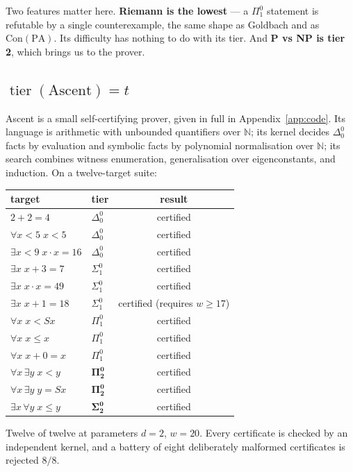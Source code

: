 \documentclass[11pt,a4paper]{article}
\newcommand{\Sig}[2]{\Sigma^{#1}_{#2}}
\newcommand{\Pai}[2]{\Pi^{#1}_{#2}}
\newcommand{\Del}[2]{\Delta^{#1}_{#2}}
\newcommand{\tier}{\operatorname{tier}}
\begin{document}
Two features matter here. \textbf{Riemann is the lowest} --- a $\Pai{0}{1}$
statement is refutable by a single counterexample, the same shape as Goldbach
and as $\mathrm{Con}(\mathrm{PA})$. Its difficulty has nothing to do with its
tier. And \textbf{P vs NP is tier 2}, which brings us to the prover.

\subsection{$\tier(\text{Ascent}) = t$}

Ascent is a small self-certifying prover, given in full in
Appendix~\ref{app:code}. Its language is arithmetic with unbounded quantifiers
over $\mathbb{N}$; its kernel decides $\Del{0}{0}$ facts by evaluation and
symbolic facts by polynomial normalisation over $\mathbb{N}$; its search
combines witness enumeration, generalisation over eigenconstants, and
induction. On a twelve-target suite:

\begin{center}
\begin{tabular}{@{}llc@{}}
\toprule
target & tier & result \\
\midrule
$2+2 = 4$ & $\Del{0}{0}$ & certified \\
$\forall x{<}5\; x < 5$ & $\Del{0}{0}$ & certified \\
$\exists x{<}9\; x\cdot x = 16$ & $\Del{0}{0}$ & certified \\
$\exists x\; x+3 = 7$ & $\Sig{0}{1}$ & certified \\
$\exists x\; x\cdot x = 49$ & $\Sig{0}{1}$ & certified \\
$\exists x\; x+1 = 18$ & $\Sig{0}{1}$ & certified (requires $w \ge 17$) \\
$\forall x\; x < Sx$ & $\Pai{0}{1}$ & certified \\
$\forall x\; x \le x$ & $\Pai{0}{1}$ & certified \\
$\forall x\; x+0 = x$ & $\Pai{0}{1}$ & certified \\
$\forall x\, \exists y\; x < y$ & $\mathbf{\Pai{0}{2}}$ & certified \\
$\forall x\, \exists y\; y = Sx$ & $\mathbf{\Pai{0}{2}}$ & certified \\
$\exists x\, \forall y\; x \le y$ & $\mathbf{\Sig{0}{2}}$ & certified \\
\bottomrule
\end{tabular}
\end{center}

Twelve of twelve at parameters $d = 2$, $w = 20$. Every certificate is checked
by an independent kernel, and a battery of eight deliberately malformed
certificates is rejected $8/8$.
\end{document}
